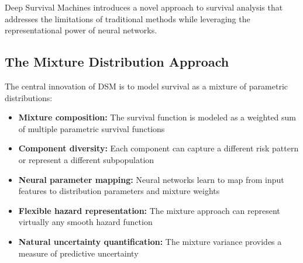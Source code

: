 Deep Survival Machines introduces a novel approach to survival analysis that addresses the limitations of traditional methods while leveraging the representational power of neural networks.

\subsection{The Mixture Distribution Approach}

The central innovation of DSM is to model survival as a mixture of parametric distributions:

\begin{itemize}
    \item \textbf{Mixture composition:} The survival function is modeled as a weighted sum of multiple parametric survival functions
    \item \textbf{Component diversity:} Each component can capture a different risk pattern or represent a different subpopulation
    \item \textbf{Neural parameter mapping:} Neural networks learn to map from input features to distribution parameters and mixture weights
    \item \textbf{Flexible hazard representation:} The mixture approach can represent virtually any smooth hazard function
    \item \textbf{Natural uncertainty quantification:} The mixture variance provides a measure of predictive uncertainty
\end{itemize}

